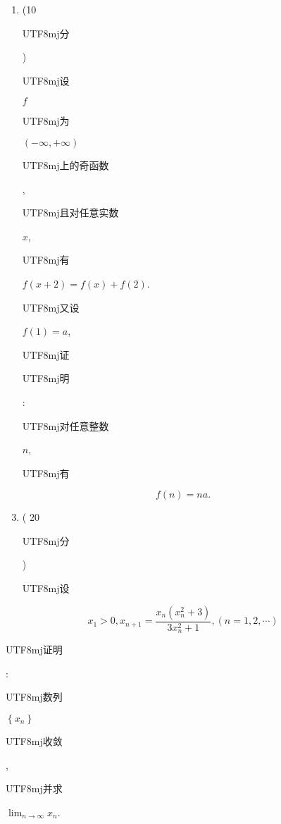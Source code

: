 \documentclass[10pt]{article}
\begin{document}
\begin{enumerate}
  \item (10 \begin{CJK}{UTF8}{mj}分\end{CJK}) \begin{CJK}{UTF8}{mj}设\end{CJK} $f$ \begin{CJK}{UTF8}{mj}为\end{CJK} $(-\infty,+\infty)$ \begin{CJK}{UTF8}{mj}上的奇函数\end{CJK}, \begin{CJK}{UTF8}{mj}且对任意实数\end{CJK} $x$, \begin{CJK}{UTF8}{mj}有\end{CJK} $f(x+2)=f(x)+f(2)$. \begin{CJK}{UTF8}{mj}又设\end{CJK} $f(1)=a$, \begin{CJK}{UTF8}{mj}证\end{CJK} \begin{CJK}{UTF8}{mj}明\end{CJK}: \begin{CJK}{UTF8}{mj}对任意整数\end{CJK} $n$, \begin{CJK}{UTF8}{mj}有\end{CJK}
\end{enumerate}
$$
f(n)=n a .
$$

\begin{enumerate}
  \setcounter{enumi}{2}
  \item ( 20 \begin{CJK}{UTF8}{mj}分\end{CJK}) \begin{CJK}{UTF8}{mj}设\end{CJK}
\end{enumerate}
$$
x_{1}>0, x_{n+1}=\frac{x_{n}\left(x_{n}^{2}+3\right)}{3 x_{n}^{2}+1},(n=1,2, \cdots)
$$
\begin{CJK}{UTF8}{mj}证明\end{CJK}: \begin{CJK}{UTF8}{mj}数列\end{CJK} $\left\{x_{n}\right\}$ \begin{CJK}{UTF8}{mj}收敛\end{CJK}, \begin{CJK}{UTF8}{mj}并求\end{CJK} $\lim _{n \rightarrow \infty} x_{n}$.
\end{document}

